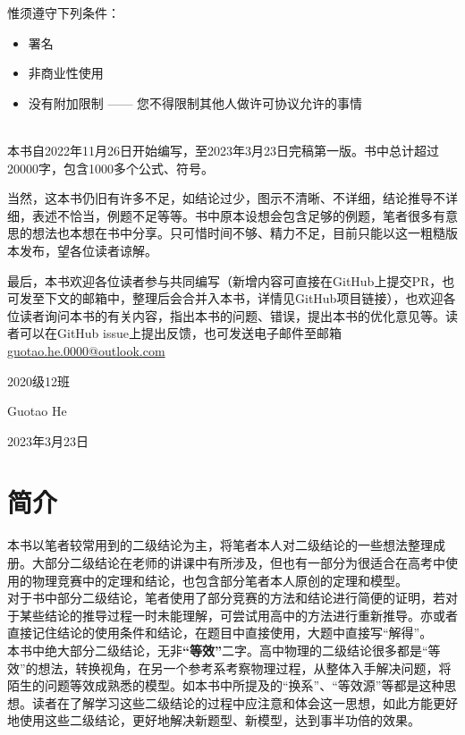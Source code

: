 \documentclass{gbook}
\begin{document}
惟须遵守下列条件：
\begin{itemize}
    \item 署名
    \item 非商业性使用
    \item 没有附加限制 —— 您不得限制其他人做许可协议允许的事情
\end{itemize}
~\\

本书自2022年11月26日开始编写，至2023年3月23日完稿第一版。书中总计超过20000字，包含1000多个公式、符号。

当然，这本书仍旧有许多不足，如结论过少，图示不清晰、不详细，结论推导不详细，表述不恰当，例题不足等等。书中原本设想会包含足够的例题，笔者很多有意思的想法也本想在书中分享。只可惜时间不够、精力不足，目前只能以这一粗糙版本发布，望各位读者谅解。

最后，本书欢迎各位读者参与共同编写（新增内容可直接在GitHub上提交PR，也可发至下文的邮箱中，整理后会合并入本书，详情见GitHub项目链接），也欢迎各位读者询问本书的有关内容，指出本书的问题、错误，提出本书的优化意见等。读者可以在GitHub issue上提出反馈，也可发送电子邮件至邮箱\url{guotao.he.0000@outlook.com}
~\\

\begin{flushright}
2020级12班

Guotao He

2023年3月23日
\end{flushright}
\newpage

\section*{简介}


本书以笔者较常用到的二级结论为主，将笔者本人对二级结论的一些想法整理成册。大部分二级结论在老师的讲课中有所涉及，但也有一部分为很适合在高考中使用的物理竞赛中的定理和结论，也包含部分笔者本人原创的定理和模型。
~\\

对于书中部分二级结论，笔者使用了部分竞赛的方法和结论进行简便的证明，若对于某些结论的推导过程一时未能理解，可尝试用高中的方法进行重新推导。亦或者直接记住结论的使用条件和结论，在题目中直接使用，大题中直接写“解得”。
~\\

本书中绝大部分二级结论，无非\textbf{“等效”}二字。高中物理的二级结论很多都是“等效”的想法，转换视角，在另一个参考系考察物理过程，从整体入手解决问题，将陌生的问题等效成熟悉的模型。如本书中所提及的“换系”、“等效源”等都是这种思想。读者在了解学习这些二级结论的过程中应注意和体会这一思想，如此方能更好地使用这些二级结论，更好地解决新题型、新模型，达到事半功倍的效果。
~\\
\end{document}
